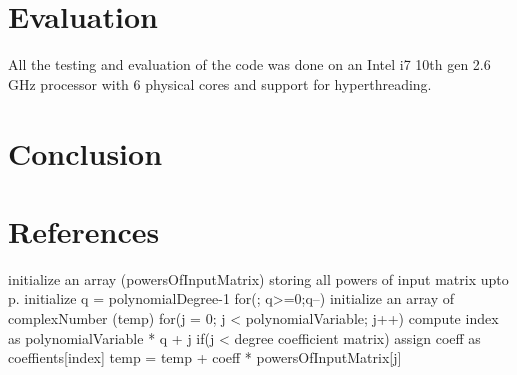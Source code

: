 \documentclass[12pt,a4paper]{article}
\begin{document}
\section{Evaluation}

All the testing and evaluation of the code was done on an Intel i7 10th gen 2.6 GHz processor with 6 physical cores and support for hyperthreading. 

\section{Conclusion}

\section{References}
initialize an array (powersOfInputMatrix) storing all powers of input matrix upto p.
initialize q = polynomialDegree-1
for(; q>=0;q--)
    initialize an array of complexNumber (temp)
    for(j = 0; j < polynomialVariable; j++)
        compute index as polynomialVariable * q + j
        if(j < degree coefficient matrix) assign coeff as coeffients[index]
        temp = temp + coeff * powersOfInputMatrix[j]




\end{document}
